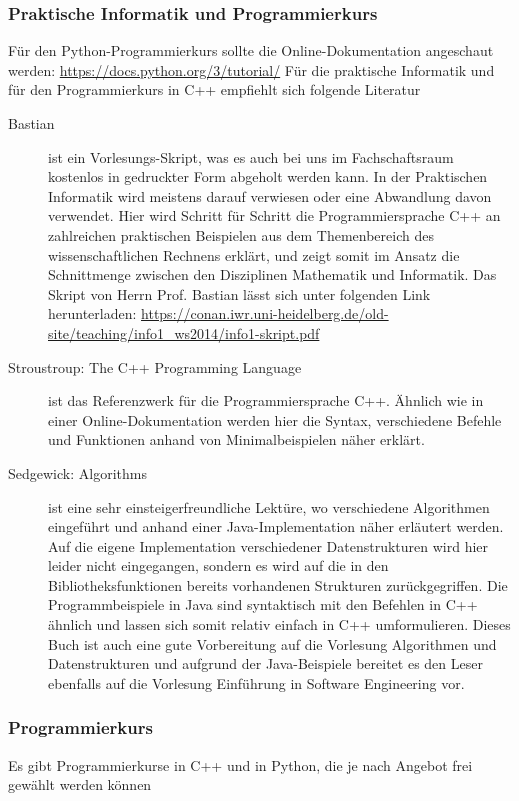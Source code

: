 \subsubsection*{Praktische Informatik und Programmierkurs}
Für den Python-Programmierkurs sollte die Online-Dokumentation angeschaut werden:
\url{https://docs.python.org/3/tutorial/}
Für die praktische Informatik und für den Programmierkurs in C++ empfiehlt sich folgende Literatur
\begin{description}
\item[Bastian]{
	ist ein Vorlesungs-Skript, was es auch bei uns im Fachschaftsraum kostenlos in gedruckter
Form abgeholt werden kann. In der Praktischen Informatik wird meistens darauf verwiesen oder 
eine Abwandlung davon verwendet. Hier wird Schritt für Schritt die Programmiersprache C++ an
zahlreichen praktischen Beispielen aus dem Themenbereich des wissenschaftlichen Rechnens erklärt, 
und zeigt somit im Ansatz die Schnittmenge zwischen den Disziplinen Mathematik und Informatik.
Das Skript von Herrn Prof. Bastian lässt sich unter folgenden Link herunterladen:
\url{https://conan.iwr.uni-heidelberg.de/old-site/teaching/info1_ws2014/info1-skript.pdf}}
	
\item[Stroustroup: The C++ Programming Language]{
	ist das Referenzwerk für
die Programmiersprache C++. Ähnlich wie in einer Online-Dokumentation werden
hier die Syntax, verschiedene Befehle und Funktionen anhand von Minimalbeispielen
näher erklärt.}
	
\item[Sedgewick: Algorithms]{
	ist eine sehr einsteigerfreundliche Lektüre, wo 
verschiedene Algorithmen eingeführt und anhand einer Java-Implementation
näher erläutert werden. Auf die eigene Implementation verschiedener Datenstrukturen
wird hier leider nicht eingegangen, sondern es wird auf die in den Bibliotheksfunktionen
bereits vorhandenen Strukturen zurückgegriffen.
Die Programmbeispiele in Java sind syntaktisch mit den Befehlen in C++ ähnlich und lassen
sich somit relativ einfach in C++ umformulieren.
Dieses Buch ist auch eine gute Vorbereitung auf die Vorlesung Algorithmen und Datenstrukturen
und aufgrund der Java-Beispiele bereitet es den Leser ebenfalls auf die Vorlesung 
Einführung in Software Engineering vor.} 

\end{description}

\subsubsection*{Programmierkurs}
Es gibt Programmierkurse in C++ und in Python, die je nach Angebot frei gewählt werden können
\begin{description}
\item[]
\end{description}

